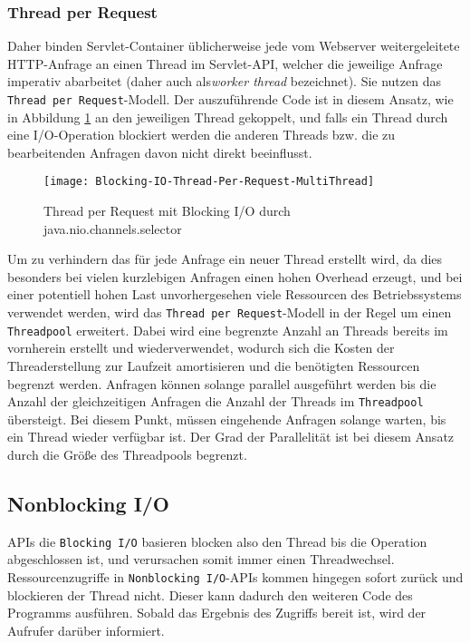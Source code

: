 \subsubsection{Thread per Request}
\label{subsubsec:thread per request}
Daher binden Servlet-Container üblicherweise jede vom Webserver weitergeleitete HTTP-Anfrage an einen
Thread im Servlet-API, welcher die jeweilige Anfrage imperativ abarbeitet
(daher auch als\textit{worker thread} bezeichnet). Sie nutzen das \verb|Thread per Request|-Modell.
Der auszuführende Code ist in diesem Ansatz, wie in Abbildung \ref{fig:blocking_thread_per_request}
an den jeweiligen Thread gekoppelt, und falls ein Thread durch eine I/O-Operation blockiert werden
die anderen Threads bzw. die zu bearbeitenden Anfragen davon nicht direkt beeinflusst.
\begin{figure}[ht]
	\centering
	\texttt{[image: Blocking-IO-Thread-Per-Request-MultiThread]}
	\caption{Thread per Request mit Blocking I/O durch java.nio.channels.selector \parencite{NettyInAction}}
	\label{fig:blocking_thread_per_request}
\end{figure}

Um zu verhindern das für jede Anfrage ein neuer Thread erstellt wird, da dies besonders bei vielen kurzlebigen
Anfragen einen hohen Overhead erzeugt, und bei einer potentiell hohen Last
unvorhergesehen viele Ressourcen des Betriebssystems verwendet werden, wird das \verb|Thread per Request|-Modell
in der Regel um einen \verb|Threadpool| erweitert.
Dabei wird eine begrenzte Anzahl an Threads bereits im vornherein erstellt und wiederverwendet, wodurch sich die Kosten der Threaderstellung
zur Laufzeit amortisieren und die benötigten Ressourcen begrenzt werden.
Anfragen können solange parallel ausgeführt werden bis die Anzahl der gleichzeitigen Anfragen die
Anzahl der Threads im \verb|Threadpool| übersteigt.
Bei diesem Punkt, müssen eingehende Anfragen solange warten, bis ein Thread wieder verfügbar ist.
Der Grad der Parallelität ist bei diesem Ansatz durch die Größe des Threadpools begrenzt.

\subsection{Nonblocking I/O}
\label{subsec:nonblocking-i/o}
APIs die \verb|Blocking I/O| basieren blocken also den Thread bis die Operation abgeschlossen ist, und verursachen somit
immer einen Threadwechsel.
Ressourcenzugriffe in \verb|Nonblocking I/O|-APIs kommen hingegen sofort zurück und blockieren der Thread nicht.
Dieser kann dadurch den weiteren Code des Programms ausführen.
Sobald das Ergebnis des Zugriffs bereit ist, wird der Aufrufer darüber informiert.

